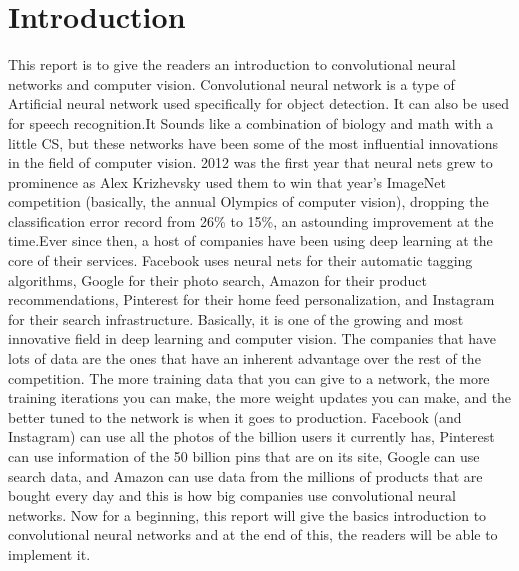 \documentclass[12pt]{article}
\begin{document}
\section{\fontsize{14}{14}\selectfont Introduction}
 \par This report is to give the readers an introduction to convolutional neural networks and computer vision.  Convolutional neural network is a type of Artificial neural network used specifically for object detection. It can also be used for speech recognition.It Sounds like a combination of biology and math with a little CS, but these networks have been some of the most influential innovations in the field of computer vision. 2012 was the first year that neural nets grew to prominence as Alex Krizhevsky used them to win that year’s ImageNet competition (basically, the annual Olympics of computer vision), dropping the classification error record from 26\% to 15\%, an astounding improvement at the time.Ever since then, a host of companies have been using deep learning at the core of their services. Facebook uses neural nets for their automatic tagging algorithms, Google for their photo search, Amazon for their product recommendations, Pinterest for their home feed personalization, and Instagram for their search infrastructure. Basically, it is one of the growing and most innovative field in deep learning and computer vision. The companies that have lots of data are the ones that have an inherent advantage over the rest of the competition. The more training data that you can give to a network, the more training iterations you can make, the more weight updates you can make, and the better tuned to the network is when it goes to production. Facebook (and Instagram) can use all the photos of the billion users it currently has, Pinterest can use information of the 50 billion pins that are on its site, Google can use search data, and Amazon can use data from the millions of products that are bought every day and this is how big companies use convolutional neural networks. Now for a beginning, this report will give the basics introduction to convolutional neural networks and at the end of this, the readers will be able to implement it.
\end{document}
